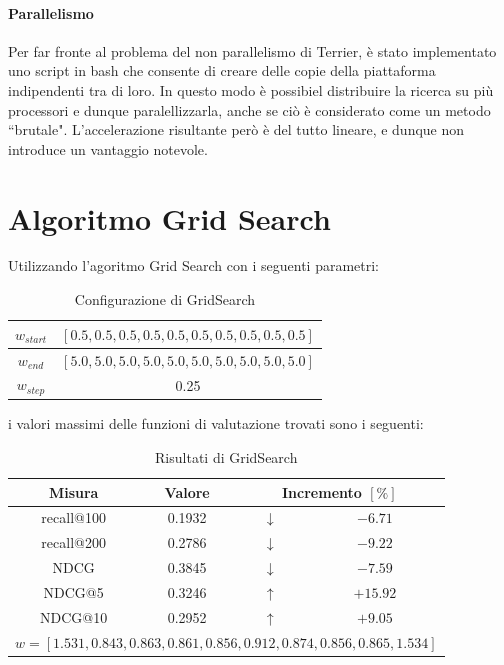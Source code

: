 \paragraph{Parallelismo}
Per far fronte al problema del non parallelismo di Terrier, è stato implementato uno
script in bash che consente di creare delle copie della piattaforma indipendenti tra di loro.
In questo modo è possibiel distribuire la ricerca su più processori e dunque paralellizzarla,
anche se ciò è considerato come un metodo ``brutale". L'accelerazione risultante però
è del tutto lineare, e dunque non introduce un vantaggio notevole.


\section{Algoritmo Grid Search}
Utilizzando l'agoritmo Grid Search con i seguenti parametri:

\begin{table}[h!]
	\centering
	\begin{tabular}{|c|c|}
		\hline
		$w_{start}$ & $[0.5, 0.5, 0.5, 0.5, 0.5, 0.5, 0.5, 0.5, 0.5, 0.5]$ \\
		\hline
		$w_{end}$ & $[5.0, 5.0, 5.0, 5.0, 5.0, 5.0, 5.0, 5.0, 5.0, 5.0]$ \\		
		\hline
		$w_{step}$ & 0.25 \\
		\hline
	\end{tabular}
\caption{Configurazione di GridSearch}
\end{table}

i valori massimi delle funzioni di valutazione trovati sono i seguenti:

\begin{table}[h!]
	\centering
	\begin{tabular}{|c|c|c|c|}
		\hline
		\textbf{Misura} & \textbf{Valore} & \multicolumn{2}{|c|}{\textbf{Incremento} $\left[\%\right]$} \\
		\hline
		recall@100  &  0.1932 &   $\downarrow$ & $-6.71$ \\
		\hline
		recall@200   & 0.2786 & $\downarrow$ & $-9.22$ \\
		\hline
		NDCG    & 0.3845 &  $\downarrow$ & $-7.59$ \\
		\hline
		NDCG@5  & 0.3246 & $\uparrow$ & $+15.92$ \\
		\hline
		NDCG@10  & 0.2952 & $\uparrow$  & $+9.05$ \\
		\hline
		\multicolumn{4}{|c|}{$w = [1.531, 0.843, 0.863, 0.861, 0.856 , 0.912, 0.874, 0.856, 0.865, 1.534]$} \\
		\hline
	\end{tabular}
	\caption{Risultati di GridSearch}
\end{table}

